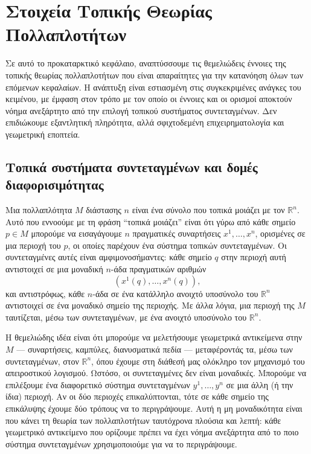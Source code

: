 \documentclass[12pt]{article}
\begin{document}

\section{Στοιχεία Τοπικής Θεωρίας Πολλαπλοτήτων}

Σε αυτό το προκαταρκτικό κεφάλαιο, αναπτύσσουμε τις θεμελιώδεις έννοιες της τοπικής θεωρίας πολλαπλοτήτων που είναι απαραίτητες για την κατανόηση όλων των επόμενων κεφαλαίων. Η ανάπτυξη είναι εστιασμένη στις συγκεκριμένες ανάγκες του κειμένου, με έμφαση στον τρόπο με τον οποίο οι έννοιες και οι ορισμοί αποκτούν νόημα ανεξάρτητο από την επιλογή τοπικού συστήματος συντεταγμένων. Δεν επιδιώκουμε εξαντλητική πληρότητα, αλλά σφιχτοδεμένη επιχειρηματολογία και γεωμετρική εποπτεία.

\subsection{Τοπικά συστήματα συντεταγμένων και δομές διαφορισιμότητας}

Μια πολλαπλότητα $M$ διάστασης $n$ είναι ένα σύνολο που τοπικά μοιάζει με τον $\mathbb{R}^n$. Αυτό που εννοούμε με τη φράση ``τοπικά μοιάζει'' είναι ότι γύρω από κάθε σημείο $p \in M$ μπορούμε να εισαγάγουμε $n$ πραγματικές συναρτήσεις $x^1, \dots, x^n$, ορισμένες σε μια περιοχή του $p$, οι οποίες παρέχουν ένα σύστημα τοπικών συντεταγμένων. Οι συντεταγμένες αυτές είναι αμφιμονοσήμαντες: κάθε σημείο $q$ στην περιοχή αυτή αντιστοιχεί σε μια μοναδική $n$-άδα πραγματικών αριθμών
\[
(x^1(q), \dots, x^n(q)),
\]
και αντιστρόφως, κάθε $n$-άδα σε ένα κατάλληλο ανοιχτό υποσύνολο του $\mathbb{R}^n$ αντιστοιχεί σε ένα μοναδικό σημείο της περιοχής. Με άλλα λόγια, μια περιοχή της $M$ ταυτίζεται, μέσω των συντεταγμένων, με ένα ανοιχτό υποσύνολο του $\mathbb{R}^n$.

Η θεμελιώδης ιδέα είναι ότι μπορούμε να μελετήσουμε γεωμετρικά αντικείμενα στην $M$ --- συναρτήσεις, καμπύλες, διανυσματικά πεδία --- μεταφέροντάς τα, μέσω των συντεταγμένων, στον $\mathbb{R}^n$, όπου έχουμε στη διάθεσή μας ολόκληρο τον μηχανισμό του απειροστικού λογισμού. Ωστόσο, οι συντεταγμένες δεν είναι μοναδικές. Μπορούμε να επιλέξουμε ένα διαφορετικό σύστημα συντεταγμένων $y^1, \dots, y^n$ σε μια άλλη (ή την ίδια) περιοχή. Αν οι δύο περιοχές επικαλύπτονται, τότε σε κάθε σημείο της επικάλυψης έχουμε δύο τρόπους να το περιγράψουμε. Αυτή η μη μοναδικότητα είναι που κάνει τη θεωρία των πολλαπλοτήτων ταυτόχρονα πλούσια και λεπτή: κάθε γεωμετρικό αντικείμενο που ορίζουμε πρέπει να έχει νόημα ανεξάρτητα από το ποιο σύστημα συντεταγμένων χρησιμοποιούμε για να το περιγράψουμε.
\end{document}

